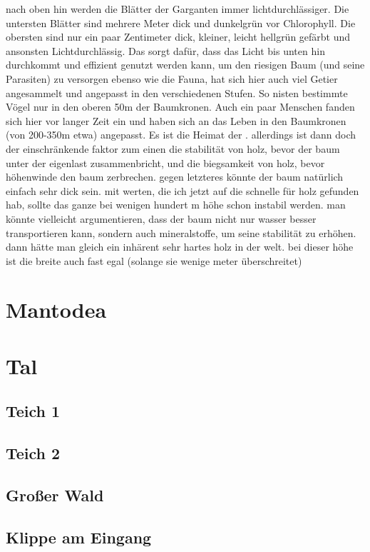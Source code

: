 \begin{outline}
	\1 nach oben hin werden die Blätter der Garganten immer lichtdurchlässiger. Die untersten Blätter sind mehrere Meter dick und dunkelgrün vor Chlorophyll. Die obersten sind nur ein paar Zentimeter dick, kleiner, leicht hellgrün gefärbt und ansonsten Lichtdurchlässig. Das sorgt dafür, dass das Licht bis unten hin durchkommt und effizient genutzt werden kann, um den riesigen Baum (und seine Parasiten) zu versorgen
	\1 ebenso wie die Fauna, hat sich hier auch viel Getier angesammelt und angepasst in den verschiedenen Stufen. So nisten bestimmte Vögel nur in den oberen 50m der Baumkronen. Auch ein paar Menschen fanden sich hier vor langer Zeit ein und haben sich an das Leben in den Baumkronen (von 200-350m etwa) angepasst. Es ist die Heimat der .
	\1 allerdings ist dann doch der einschränkende faktor zum einen die stabilität von holz, bevor der baum unter der eigenlast zusammenbricht, und die biegsamkeit von holz, bevor höhenwinde den baum zerbrechen. gegen letzteres könnte der baum natürlich einfach sehr dick sein. mit werten, die ich jetzt auf die schnelle für holz gefunden hab, sollte das ganze bei wenigen hundert m höhe schon instabil werden. man könnte vielleicht argumentieren, dass der baum nicht nur wasser besser transportieren kann, sondern auch mineralstoffe, um seine stabilität zu erhöhen. dann hätte man gleich ein inhärent sehr hartes holz in der welt. bei dieser höhe ist die breite auch fast egal (solange sie wenige meter überschreitet)
\end{outline}

\section{Mantodea} \label{sec:land}
\section{Tal}
\subsection{Teich 1}
\subsection{Teich 2}
\subsection{Großer Wald}
\subsection{Klippe am Eingang}

